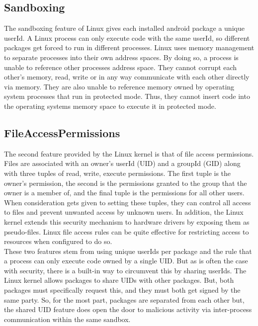 \subsection{Sandboxing}
\label{sec:Sandboxing}

The sandboxing feature of Linux gives each installed android package a unique userId.  A Linux process can only execute code with the same userId, so different packages get forced to run in different processes.  Linux uses memory management to separate processes into their own address spaces.  By doing so, a process is unable to reference other processes address space.  They cannot corrupt each other's memory, read, write or in any way communicate with each other directly via memory.  They are also unable to reference memory owned by operating system processes that run in protected mode.  Thus, they cannot insert code into the operating systems memory space to execute it in protected mode. 
  
\subsection{FileAccessPermissions}
\label{sec:FileAccessPermissions}  

The second feature provided by the Linux kernel is that of file access permissions.  Files are associated with an owner's userId (UID) and a groupId (GID) along with three tuples of read, write, execute permissions.  The first tuple is the owner's permission, the second is the permissions granted to the group that the owner is a member of, and the final tuple is the permissions for all other users.  When consideration gets given to setting these tuples, they can control all access to files and prevent unwanted access by unknown users.  In addition, the Linux kernel extends this security mechanism to hardware drivers by exposing them as pseudo-files.  Linux file access rules can be quite effective for restricting access to resources when configured to do so.\\

\noindent
These two features stem from using unique userIds per package and the rule that a process can only execute code owned by a single UID.  But as is often the case with security, there is a built-in way to circumvent this by sharing userIds.  The Linux kernel allows packages to share UIDs with other packages.  But, both packages must specifically request this, and they must both get signed by the same party.  So, for the most part, packages are separated from each other but, the shared UID feature does open the door to malicious activity via inter-process communication within the same sandbox.

